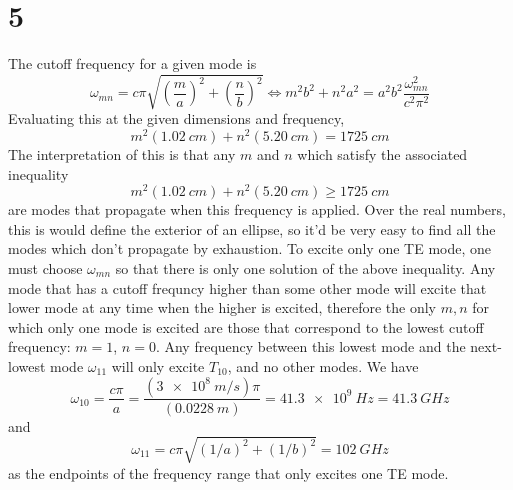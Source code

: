 \documentclass{article}
\begin{document}
\section*{5}
The cutoff frequency for a given mode is
\[\omega_{mn}=c\pi\sqrt{\left( \frac{m}{a} \right)^{2}+\left( \frac{n}{b}\right)^{2}}\Leftrightarrow m^{2}b^{2}+n^{2}a^{2}=a^{2}b^{2}\frac{\omega_{mn}^{2}}{c^{2}\pi^{2}}\]
Evaluating this at the given dimensions and frequency,
\[m^{2}(\SI{1.02}{cm})+n^{2}(\SI{5.20}{cm})=\SI{1725}{cm}\]
The interpretation of this is that any $m$ and $n$ which satisfy the associated inequality
\[m^{2}(\SI{1.02}{cm})+n^{2}(\SI{5.20}{cm})\geq\SI{1725}{cm}\]
are modes that propagate when this frequency is applied. Over the real numbers, this is would define the exterior of an ellipse, so it'd be very easy to find all the modes which don't propagate by exhaustion.
To excite only one TE mode, one must choose $\omega_{mn}$ so that there is only one solution of the above inequality. Any mode that has a cutoff frequncy higher than some other mode will excite that lower mode at any time when the higher is excited, therefore the only $m,n$ for which only one mode is excited are those that correspond to the lowest cutoff frequency: $m=1$, $n=0$. Any frequency between this lowest mode and the next-lowest mode $\omega_{11}$ will only excite $T_{10}$, and no other modes.
We have
\[\omega_{10}=\frac{c\pi}{a}=\frac{(\SI{3e8}{m/s})\pi}{(\SI{0.0228}{m})}=\SI{41.3e9}{Hz}=\SI{41.3}{GHz}\]
and
\[\omega_{11}={c\pi}\sqrt{(1/a)^{2}+(1/b)^{2}}=\SI{102}{GHz}\]
as the endpoints of the frequency range that only excites one TE mode.
\end{document}
